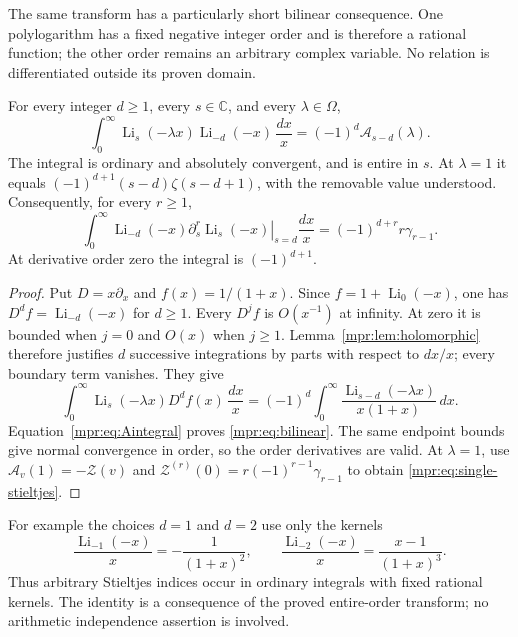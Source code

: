 The same transform has a particularly short bilinear consequence.
One polylogarithm has a fixed negative integer order and is therefore
a rational function; the other order remains an arbitrary complex
variable.  No relation is differentiated outside its proven domain.

\begin{corollary}\label{mpr:cor:bilinear}
For every integer $d\ge1$, every $s\in\mathbb C$, and every
$\lambda\in\Omega$,
\begin{equation}\label{mpr:eq:bilinear}
 \boxed{\displaystyle
 \int_0^\infty\operatorname{Li}_s(-\lambda x)
                    \operatorname{Li}_{-d}(-x)\,\frac{dx}{x}
   =(-1)^d\mathcal A_{s-d}(\lambda).}
\end{equation}
The integral is ordinary and absolutely convergent, and is entire in
$s$.  At $\lambda=1$ it equals
$(-1)^{d+1}(s-d)\zeta(s-d+1)$, with the removable value understood.
Consequently, for every $r\ge1$,
\begin{equation}\label{mpr:eq:single-stieltjes}
 \boxed{\displaystyle
 \int_0^\infty\operatorname{Li}_{-d}(-x)
       \left.\partial_s^r\operatorname{Li}_s(-x)\right|_{s=d}
                 \frac{dx}{x}
        =(-1)^{d+r}r\gamma_{r-1}.}
\end{equation}
At derivative order zero the integral is $(-1)^{d+1}$.
\end{corollary}

\begin{proof}
Put $D=x\partial_x$ and $f(x)=1/(1+x)$.  Since
$f=1+\operatorname{Li}_0(-x)$, one has
$D^df=\operatorname{Li}_{-d}(-x)$ for $d\ge1$.
Every $D^jf$ is $O(x^{-1})$ at infinity.  At zero it is bounded
when $j=0$ and $O(x)$ when $j\ge1$.
Lemma~\ref{mpr:lem:holomorphic} therefore justifies $d$ successive
integrations by parts with respect to $dx/x$; every boundary term
vanishes.  They give
\[
 \int_0^\infty\operatorname{Li}_s(-\lambda x)D^df(x)\,\frac{dx}{x}
  =(-1)^d\int_0^\infty
       \frac{\operatorname{Li}_{s-d}(-\lambda x)}{x(1+x)}\,dx.
\]
Equation~\eqref{mpr:eq:Aintegral} proves \eqref{mpr:eq:bilinear}.
The same endpoint bounds give normal convergence in order, so the
order derivatives are valid.  At $\lambda=1$, use
$\mathcal A_v(1)=-\mathscr Z(v)$ and
$\mathscr Z^{(r)}(0)=r(-1)^{r-1}\gamma_{r-1}$ to obtain
\eqref{mpr:eq:single-stieltjes}.
\end{proof}

For example the choices $d=1$ and $d=2$ use only the kernels
\[
 \frac{\operatorname{Li}_{-1}(-x)}x=-\frac1{(1+x)^2},\qquad
 \frac{\operatorname{Li}_{-2}(-x)}x=\frac{x-1}{(1+x)^3}.
\]
Thus arbitrary Stieltjes indices occur in ordinary integrals with
fixed rational kernels.  The identity is a consequence of the
proved entire-order transform; no arithmetic independence assertion
is involved.


